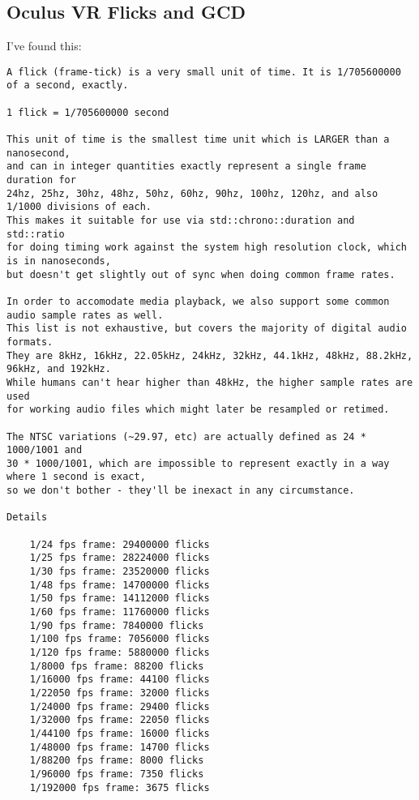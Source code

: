 \subsection{Oculus VR Flicks and GCD}

I've found this:

\begin{lstlisting}
A flick (frame-tick) is a very small unit of time. It is 1/705600000 of a second, exactly.

1 flick = 1/705600000 second

This unit of time is the smallest time unit which is LARGER than a nanosecond,
and can in integer quantities exactly represent a single frame duration for 
24hz, 25hz, 30hz, 48hz, 50hz, 60hz, 90hz, 100hz, 120hz, and also 1/1000 divisions of each.
This makes it suitable for use via std::chrono::duration and std::ratio 
for doing timing work against the system high resolution clock, which is in nanoseconds,
but doesn't get slightly out of sync when doing common frame rates.

In order to accomodate media playback, we also support some common audio sample rates as well.
This list is not exhaustive, but covers the majority of digital audio formats.
They are 8kHz, 16kHz, 22.05kHz, 24kHz, 32kHz, 44.1kHz, 48kHz, 88.2kHz, 96kHz, and 192kHz. 
While humans can't hear higher than 48kHz, the higher sample rates are used 
for working audio files which might later be resampled or retimed.

The NTSC variations (~29.97, etc) are actually defined as 24 * 1000/1001 and 
30 * 1000/1001, which are impossible to represent exactly in a way where 1 second is exact,
so we don't bother - they'll be inexact in any circumstance.

Details

    1/24 fps frame: 29400000 flicks
    1/25 fps frame: 28224000 flicks
    1/30 fps frame: 23520000 flicks
    1/48 fps frame: 14700000 flicks
    1/50 fps frame: 14112000 flicks
    1/60 fps frame: 11760000 flicks
    1/90 fps frame: 7840000 flicks
    1/100 fps frame: 7056000 flicks
    1/120 fps frame: 5880000 flicks
    1/8000 fps frame: 88200 flicks
    1/16000 fps frame: 44100 flicks
    1/22050 fps frame: 32000 flicks
    1/24000 fps frame: 29400 flicks
    1/32000 fps frame: 22050 flicks
    1/44100 fps frame: 16000 flicks
    1/48000 fps frame: 14700 flicks
    1/88200 fps frame: 8000 flicks
    1/96000 fps frame: 7350 flicks
    1/192000 fps frame: 3675 flicks
\end{lstlisting}

